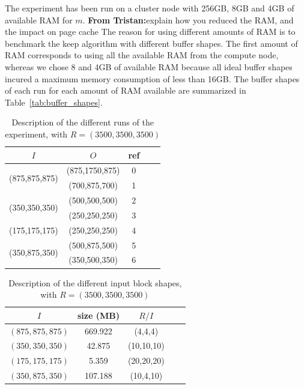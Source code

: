 \documentclass[sigconf, nonacm]{acmart}
\newcommand{\tristan}[1]{\color{orange}\textbf{From Tristan:}#1\color{black}}
\begin{document}
{The experiment has been run on a cluster node with 256GB, 8GB and 4GB of
available RAM for $m$. \tristan{explain how you reduced the RAM, and the impact on page cache}
The reason for using different amounts of RAM is to benchmark the keep algorithm
with different buffer shapes.
The first amount of RAM corresponds to using all the
available RAM from the compute node, whereas we chose 8 and 4GB of available RAM
because all ideal buffer shapes incured a maximum memory consumption of less than
16GB.
The buffer shapes of each run for each amount of RAM available are summarized in
Table~\ref{tab:buffer_shapes}.

\begin{table}[ht]
  \centering
  \caption{Description of the different runs of the experiment, with $R=(3500,3500,3500)$}

   \begin{tabular}[t]{| c | c | c | c | c |}
   \hline
   $I$ & $O$ & ref \\
   \hline
   \multirow{2}{*}{(875,875,875)} & (875,1750,875) & 0 \\
   & (700,875,700) & 1 \\
   \hline
   \multirow{2}{*}{(350,350,350)} & (500,500,500) & 2 \\
   & (250,250,250) & 3 \\
   \hline
   \multirow{1}{*}{(175,175,175)} & (250,250,250) & 4 \\
   \hline
   \multirow{2}{*}{(350,875,350)} & (500,875,500) & 5 \\
   & (350,500,350) & 6 \\
   \hline
   \end{tabular}

   \label{tab:exp}

\end{table}

\begin{table}[ht]
  \centering
  \caption{Description of the different input block shapes, with $R=(3500,3500,3500)$}

   \begin{tabular}[t]{| c | c | c | c | c |}
   \hline
   $I$ & size (MB) & $R/I$ \\
   \hline
   $(875,875,875)$ & 669.922 & (4,4,4) \\
   \hline
   $(350,350,350)$ & 42.875 & (10,10,10) \\
   \hline
   $(175,175,175)$ & 5.359 & (20,20,20) \\
   \hline
   $(350,875,350)$ & 107.188 & (10,4,10) \\
   \hline
   \end{tabular}


\end{table}}
\end{document}
